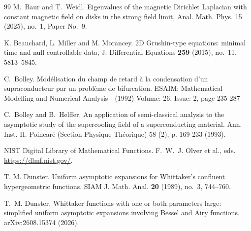 \documentclass[11pt]{amsart}
\numberwithin{equation}{section}
\theoremstyle{remark}
\begin{document}
\begin{thebibliography}{99}
M.~Baur and T.~Weidl.
\newblock Eigenvalues of the magnetic Dirichlet Laplacian with constant magnetic field on disks in the strong field limit,
\newblock Anal. Math. Phys. 15 (2025), no.~1, Paper No.~9.

 K. Beauchard, L. Miller and M. Morancey. 2D Grushin-type equations: minimal time and null controllable data, J. Differential Equations {\bf 259} (2015), no.~11, 5813--5845.


 C.~Bolley.
 \newblock Mod\'elisation du champ de retard à la condensation d'un supraconducteur par un probl\`eme de bifurcation.
\newblock 
ESAIM: Mathematical Modelling and Numerical Analysis -  (1992)
 Volume: 26, Issue: 2, page 235-287



 C.~Bolley and B.~Helffer.
\newblock An application of
semi-classical analysis to the asymptotic study
of the supercooling field of a superconducting
material. 
\newblock Ann. Inst. H. Poincar\'e (Section
Physique Th\'eorique) 58 (2), p. 169-233 (1993).


%
NIST Digital Library of Mathematical Functions.
\newblock F.~W.~J. Olver et al., eds.
\newblock \url{https://dlmf.nist.gov/}.
	
	
	T. M. Dunster.
	\newblock Uniform asymptotic expansions for {W}hittaker's confluent hypergeometric functions.
	\newblock SIAM J. Math. Anal. \textbf{20} (1989), no.~3, 744--760. 
	
%
T.~M. Dunster.
\newblock Whittaker functions with one or both parameters large:
simplified uniform asymptotic expansions involving Bessel and Airy functions.
\newblock arXiv:2608.15374 (2026).
	

\end{thebibliography}
\end{document}
